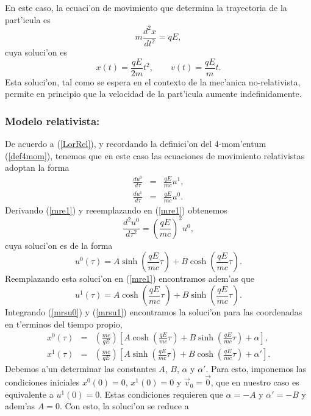 En este caso, la ecuaci'on de movimiento que determina la trayectoria de la
part'icula es
\begin{equation}
m\frac{d^2x}{dt^2}=qE,
\end{equation}
cuya soluci'on es
\begin{equation}
x(t)=\frac{qE}{2m}t^2, \qquad v(t)=\frac{qE}{m}t.
\end{equation}
Esta soluci'on, tal como se espera en el contexto de la mec'anica
no-relativista, permite en principio que la velocidad de la part'icula aumente
indefinidamente.

\subsubsection{Modelo relativista:}

De acuerdo a (\ref{LorRel}), y recordando la definici'on del 4-mom'entum (\ref{def4mom}), tenemos que en este caso las ecuaciones de movimiento relativistas adoptan la forma
\begin{eqnarray}
\frac{du^0}{d\tau}&=& \frac{qE}{mc} u^1, \label{mre1} \\
\frac{du^1}{d\tau}&=&\frac{qE}{mc} u^0.\label{mre2}
\end{eqnarray}
Derivando (\ref{mre1}) y reeemplazando en (\ref{mre1}) obtenemos
\begin{equation}
 \frac{d^2u^0}{d\tau^2}=\left( \frac{qE}{mc}\right)^2 u^0,
\end{equation}
cuya soluci'on es de la forma
\begin{equation}
u^0(\tau)=A\sinh\left( \frac{qE}{mc}\tau\right)+B\cosh\left(
\frac{qE}{mc}\tau\right). \label{mrsu0}
\end{equation}
Reemplazando esta soluci'on en (\ref{mre1}) encontramos adem'as que
\begin{equation}
u^1(\tau)=A\cosh\left( \frac{qE}{mc}\tau\right)+B\sinh\left(
\frac{qE}{mc}\tau\right). \label{mrsu1}
\end{equation}
Integrando (\ref{mrsu0}) y (\ref{mrsu1}) encontramos la soluci'on para las coordenadas en t'erminos del tiempo propio,
\begin{eqnarray}
x^0(\tau)&=&\left(\frac{mc}{qE}\right)\left[A\cosh\left( \frac{qE}{mc}\tau\right)+B\sinh\left(
\frac{qE}{mc}\tau\right)+\alpha\right] ,\\
x^1(\tau)&=&\left(\frac{mc}{qE}\right)\left[A\sinh\left( \frac{qE}{mc}\tau\right)+B\cosh\left(
\frac{qE}{mc}\tau\right)+\alpha'\right] .
\end{eqnarray}
Debemos a'un determinar las constantes $A$, $B$, $\alpha$ y $\alpha'$. Para esto, imponemos las condiciones iniciales $x^0(0)=0$, $x^1(0)=0$ y $\vec{v}_0=\vec{0}$, que en nuestro caso es equivalente a $u^1(0)=0$. Estas condiciones requieren que $\alpha=-A$ y $\alpha'=-B$ y adem'as $A=0$. Con esto, la soluci'on se reduce a
